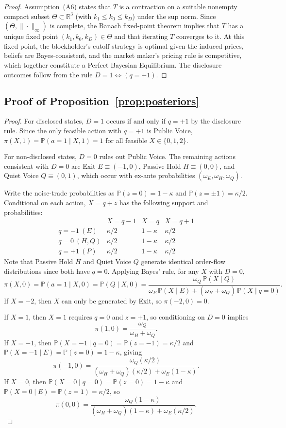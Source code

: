 \documentclass[11pt]{article}
\newcommand{\PP}{\mathbb{P}}
\newcommand{\1}{\mathbf{1}}
\newcommand{\R}{\mathbb{R}}
\begin{document}
\begin{proof}
Assumption~\textup{(A6)} states that $T$ is a contraction on a suitable nonempty compact subset $\Theta\subset\R^3$ (with $k_1\le k_0\le k_D$) under the sup norm. Since $(\Theta,\|\cdot\|_\infty)$ is complete, the Banach fixed-point theorem implies that $T$ has a unique fixed point $(k_1,k_0,k_D)\in\Theta$ and that iterating $T$ converges to it. At this fixed point, the blockholder's cutoff strategy is optimal given the induced prices, beliefs are Bayes-consistent, and the market maker's pricing rule is competitive, which together constitute a Perfect Bayesian Equilibrium. The disclosure outcomes follow from the rule $D=1\iff(q=+1)$.
\end{proof}

\subsection{Proof of Proposition~\ref{prop:posteriors}}
\label{app:proof-posteriors}

\begin{proof}
For disclosed states, $D=1$ occurs if and only if $q=+1$ by the disclosure rule. Since the only feasible action with $q=+1$ is Public Voice, $\pi(X,1)=\PP(a=1 \mid X,1)=1$ for all feasible $X\in\{0,1,2\}$.

For non-disclosed states, $D=0$ rules out Public Voice. The remaining actions consistent with $D=0$ are Exit $E\equiv(-1,0)$, Passive Hold $H\equiv(0,0)$, and Quiet Voice $Q\equiv(0,1)$, which occur with ex-ante probabilities $(\omega_E,\omega_H,\omega_Q)$.

Write the noise-trade probabilities as $\PP(z=0)=1-\kappa$ and $\PP(z=\pm1)=\kappa/2$. Conditional on each action, $X=q+z$ has the following support and probabilities:
\[
\begin{array}{c|ccc}
 & X=q-1 & X=q & X=q+1 \\ \hline
q=-1~(E) & \kappa/2 & 1-\kappa & \kappa/2 \\
q=0~(H,Q)  & \kappa/2 & 1-\kappa & \kappa/2 \\
q=+1~(P) & \kappa/2 & 1-\kappa & \kappa/2
\end{array}
\]
Note that Passive Hold $H$ and Quiet Voice $Q$ generate identical order-flow distributions since both have $q=0$. Applying Bayes' rule, for any $X$ with $D=0$,
\[
\pi(X,0)=\PP(a=1 \mid X,0)=\PP(Q \mid X,0)=\frac{\omega_Q\,\PP(X \mid Q)}{\omega_E\,\PP(X \mid E)+(\omega_H+\omega_Q)\,\PP(X \mid q\!=\!0)}.
\]
If $X=-2$, then $X$ can only be generated by Exit, so $\pi(-2,0)=0$.

If $X=1$, then $X=1$ requires $q=0$ and $z=+1$, so conditioning on $D=0$ implies
\[
\pi(1,0)=\frac{\omega_Q}{\omega_H+\omega_Q}.
\]
If $X=-1$, then $\PP(X=-1 \mid q\!=\!0)=\PP(z=-1)=\kappa/2$ and $\PP(X=-1 \mid E)=\PP(z=0)=1-\kappa$, giving
\[
\pi(-1,0)=\frac{\omega_Q(\kappa/2)}{(\omega_H+\omega_Q)(\kappa/2)+\omega_E(1-\kappa)}.
\]
If $X=0$, then $\PP(X=0 \mid q\!=\!0)=\PP(z=0)=1-\kappa$ and $\PP(X=0 \mid E)=\PP(z=1)=\kappa/2$, so
\[
\pi(0,0)=\frac{\omega_Q(1-\kappa)}{(\omega_H+\omega_Q)(1-\kappa)+\omega_E(\kappa/2)}.
\]
\end{proof}
\end{document}
